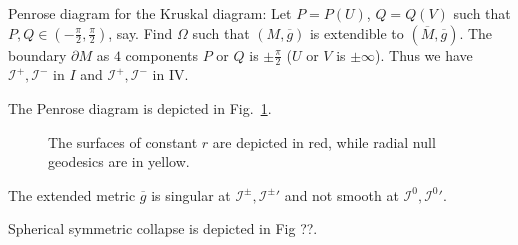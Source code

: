 Penrose diagram for the Kruskal diagram: 
Let $P = P(U)$, $Q  = Q(V)$ such that $P, Q \in (-\frac{\pi}{2}, \frac{\pi}{2})$, say.
Find $\Omega$ such that $(M, \overline{g}{})$ is extendible to $(\overline{M}{}, \overline{g}{})$. The boundary $\partial M$ as $4$ components $P$ or $Q$ is $\pm \frac{\pi}{2}$ ($U$ or $V$ is $\pm \infty$).
Thus we have $\mathscr{I}^+, \mathscr{I}^-$ in $I$ and $\mathscr{I}^+, \mathscr{I}^-$ in IV.

The Penrose diagram is depicted in Fig.~\ref{fig:l11f5}.
\begin{figure}[tbhp]
  \centering
  \def\svgwidth{0.9\columnwidth}
  
  \caption{The surfaces of constant $r$ are depicted in red, while radial null geodesics are in yellow.}
  \label{fig:l11f5}
\end{figure}

The extended metric $\overline{g}{}$ is singular at $\mathscr{I}^{\pm}, \mathscr{I}^{\pm}{}'$ and not smooth at $\mathscr{I}^0, \mathscr{I}^0{}'$.

Spherical symmetric collapse is depicted in Fig ??.
